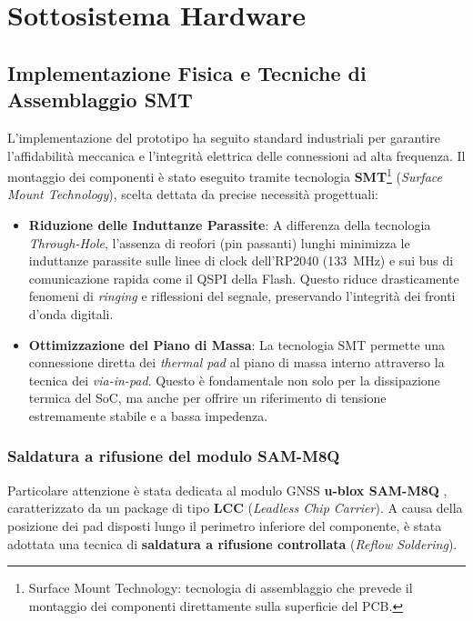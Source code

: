 \newpage
\section{Sottosistema Hardware}

\subsection{Implementazione Fisica e Tecniche di Assemblaggio SMT}

L'implementazione del prototipo ha seguito standard industriali per garantire l'affidabilità meccanica e l'integrità elettrica delle connessioni ad alta frequenza. Il montaggio dei componenti è stato eseguito tramite tecnologia \textbf{SMT}\footnote{Surface Mount Technology: tecnologia di assemblaggio che prevede il montaggio dei componenti direttamente sulla superficie del PCB.} (\textit{Surface Mount Technology}), scelta dettata da precise necessità progettuali:

\begin{itemize}
    \item \textbf{Riduzione delle Induttanze Parassite}: A differenza della tecnologia \textit{Through-Hole}, l'assenza di reofori (pin passanti) lunghi minimizza le induttanze parassite sulle linee di clock dell'RP2040 (\qty{133}{MHz}) e sui bus di comunicazione rapida come il QSPI della Flash. Questo riduce drasticamente fenomeni di \textit{ringing} e riflessioni del segnale, preservando l'integrità dei fronti d'onda digitali.
    \item \textbf{Ottimizzazione del Piano di Massa}: La tecnologia SMT permette una connessione diretta dei \textit{thermal pad} al piano di massa interno attraverso la tecnica dei \textit{via-in-pad}. Questo è fondamentale non solo per la dissipazione termica del SoC, ma anche per offrire un riferimento di tensione estremamente stabile e a bassa impedenza.
\end{itemize}



\subsubsection*{Saldatura a rifusione del modulo SAM-M8Q}

Particolare attenzione è stata dedicata al modulo GNSS \textbf{u-blox SAM-M8Q} \cite{sam_m8q_ds}, caratterizzato da un package di tipo \textbf{LCC} (\textit{Leadless Chip Carrier}). A causa della posizione dei pad disposti lungo il perimetro inferiore del componente, è stata adottata una tecnica di \textbf{saldatura a rifusione controllata} (\textit{Reflow Soldering}).



